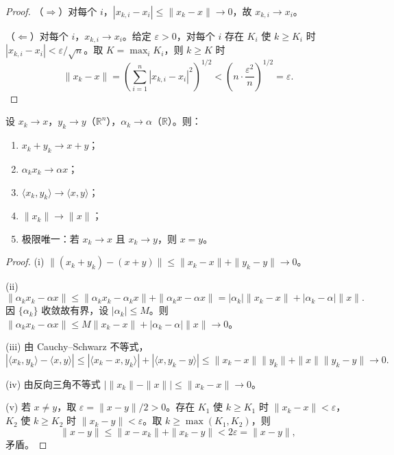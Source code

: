 \begin{proof}
（$\Rightarrow$）对每个 $i$，$|x_{k,i} - x_i| \le \|x_k - x\| \to 0$，故 $x_{k,i} \to x_i$。

（$\Leftarrow$）对每个 $i$，$x_{k,i} \to x_i$。给定 $\varepsilon > 0$，对每个 $i$ 存在 $K_i$ 使 $k \ge K_i$ 时 $|x_{k,i} - x_i| < \varepsilon/\sqrt{n}$。取 $K = \max_i K_i$，则 $k \ge K$ 时
\[
\|x_k - x\| = \left( \sum_{i=1}^{n} |x_{k,i} - x_i|^2 \right)^{1/2} < \left( n \cdot \frac{\varepsilon^2}{n} \right)^{1/2} = \varepsilon.
\]
\end{proof}

\begin{proposition}[极限的运算性质]\label{prop:limit_operations_ra}
设 $x_k \to x$，$y_k \to y$（$\mathbb{R}^n$），$\alpha_k \to \alpha$（$\mathbb{R}$）。则：
\begin{enumerate}[label=(\roman*)]
    \item $x_k + y_k \to x + y$；
    \item $\alpha_k x_k \to \alpha x$；
    \item $\langle x_k, y_k \rangle \to \langle x, y \rangle$；
    \item $\|x_k\| \to \|x\|$；
    \item 极限唯一：若 $x_k \to x$ 且 $x_k \to y$，则 $x = y$。
\end{enumerate}
\end{proposition}

\begin{proof}
(i) $\|(x_k + y_k) - (x + y)\| \le \|x_k - x\| + \|y_k - y\| \to 0$。

(ii)
\[
\|\alpha_k x_k - \alpha x\| \le \|\alpha_k x_k - \alpha_k x\| + \|\alpha_k x - \alpha x\| = |\alpha_k| \|x_k - x\| + |\alpha_k - \alpha| \|x\|.
\]
因 $\{\alpha_k\}$ 收敛故有界，设 $|\alpha_k| \le M$。则 $\|\alpha_k x_k - \alpha x\| \le M \|x_k - x\| + |\alpha_k - \alpha| \|x\| \to 0$。

(iii) 由 Cauchy--Schwarz 不等式，
\[
|\langle x_k, y_k \rangle - \langle x, y \rangle| \le |\langle x_k - x, y_k \rangle| + |\langle x, y_k - y \rangle| \le \|x_k - x\| \|y_k\| + \|x\| \|y_k - y\| \to 0.
\]

(iv) 由反向三角不等式 $| \|x_k\| - \|x\| | \le \|x_k - x\| \to 0$。

(v) 若 $x \neq y$，取 $\varepsilon = \|x - y\|/2 > 0$。存在 $K_1$ 使 $k \ge K_1$ 时 $\|x_k - x\| < \varepsilon$，$K_2$ 使 $k \ge K_2$ 时 $\|x_k - y\| < \varepsilon$。取 $k \ge \max(K_1, K_2)$，则
\[
\|x - y\| \le \|x - x_k\| + \|x_k - y\| < 2\varepsilon = \|x - y\|,
\]
矛盾。
\end{proof}

